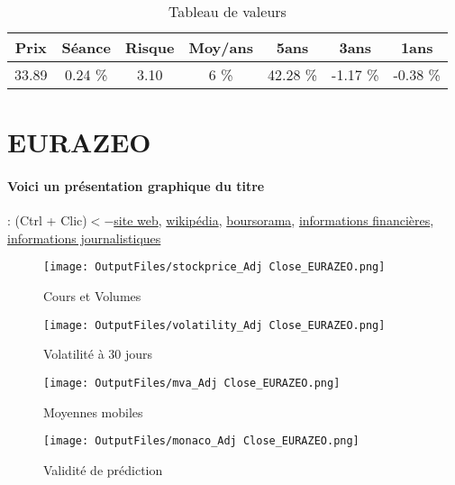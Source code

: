 \documentclass[11pt,a4paper]{report}%
\begin{document}
\begin{table}[H]
  \centering
    \begin{tabular}{|c|c|c|c|c|c|c|}
    \hline
    Prix & Séance & Risque  & Moy/ans & 5ans & 3ans & 1ans \\
    \hline
    33.89 &    0.24 \%    & 3.10 & 6 \% & 42.28 \% & -1.17 \% & -0.38 \% \\
    \hline
    \end{tabular}%
        \label{tab:table_BOUYGUES}%
      \caption{Tableau de valeurs}
\end{table}%

\newpage

\section{EURAZEO}

\paragraph{Voici un présentation graphique du titre} : (Ctrl + Clic)$<-$\href{https://www.eurazeo.com/}{site web}, \href{https://fr.wikipedia.org/wiki/Eurazeo}{wikipédia}, \href{https://www.boursorama.com/cours/1rPRF}{boursorama}, \href{https://www.qwant.com/?q=site:https:%2f%2fwww.easybourse.com%2faction-societe%2fEURAZEO&t=web&client=ext-firefox-hp}{informations financières}, \href{https://bourse.lerevenu.com/cours-de-bourse/fiche-valeur-synthese/EURAZEO/RF-FR}{informations journalistiques}
\begin{figure}[!htb]
   \begin{minipage}{0.5\textwidth}
     \centering
     \texttt{[image: OutputFiles/stockprice\_Adj Close\_EURAZEO.png]}
     \caption{Cours et Volumes}\label{Fig:price_EURAZEO}
   \end{minipage}\hfill
   \begin{minipage}{0.5\textwidth}
     \centering
     \texttt{[image: OutputFiles/volatility\_Adj Close\_EURAZEO.png]}
     \caption{Volatilité à 30 jours}\label{Fig:volat_EURAZEO}
   \end{minipage}
\end{figure}
\begin{figure}[!htb]
   \begin{minipage}{0.5\textwidth}
     \centering
     \texttt{[image: OutputFiles/mva\_Adj Close\_EURAZEO.png]}
     \caption{Moyennes mobiles}\label{Fig:mva_EURAZEO}
   \end{minipage}\hfill
   \begin{minipage}{0.5\textwidth}
     \centering
     \texttt{[image: OutputFiles/monaco\_Adj Close\_EURAZEO.png]}
     \caption{Validité de prédiction}\label{Fig:prediction_EURAZEO}
   \end{minipage}
\end{figure}
\end{document}
